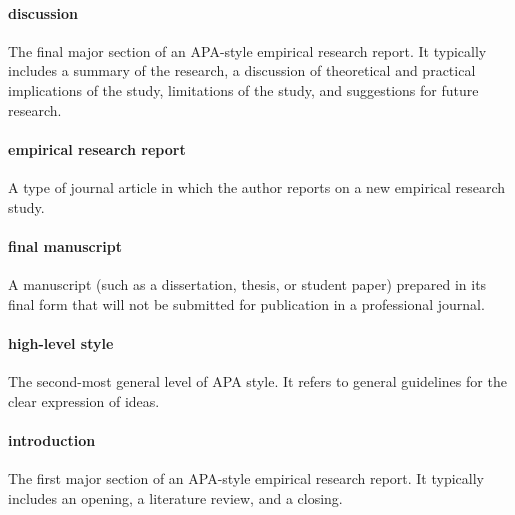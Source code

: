 \documentclass[
]{krantz}
\begin{document}
\hypertarget{discussion-1}{%
\paragraph*{discussion}\label{discussion-1}}

The final major section of an APA-style empirical research report. It typically includes a summary of the research, a discussion of theoretical and practical implications of the study, limitations of the study, and suggestions for future research.

\hypertarget{empirical-research-report-1}{%
\paragraph*{empirical research report}\label{empirical-research-report-1}}

A type of journal article in which the author reports on a new empirical research study.

\hypertarget{final-manuscript}{%
\paragraph*{final manuscript}\label{final-manuscript}}

A manuscript (such as a dissertation, thesis, or student paper) prepared in its final form that will not be submitted for publication in a professional journal.

\hypertarget{high-level-style}{%
\paragraph*{high-level style}\label{high-level-style}}

The second-most general level of APA style. It refers to general guidelines for the clear expression of ideas.

\hypertarget{introduction-1}{%
\paragraph*{introduction}\label{introduction-1}}

The first major section of an APA-style empirical research report. It typically includes an opening, a literature review, and a closing.
\end{document}
